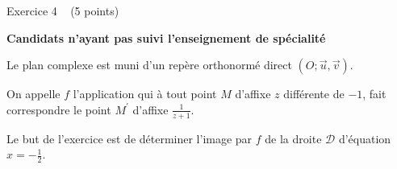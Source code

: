 
%
\begin{h2}Exercice 4   (5 points)\end{h2}
\textbf{Candidats n'ayant pas suivi l'enseignement de spécialité}
\par
Le plan complexe est muni d'un repère orthonormé direct $\left(O ; \vec{u},\vec{v}\right)$.
\par
On appelle $f $  l'application qui à tout point $M$ d'affixe $z$ différente de $-1$, fait correspondre le point $M^{\prime}$ d'affixe $\frac{1}{z+1}$.
\par
Le but de l'exercice est de déterminer l'image par $f$ de la droite $\mathscr D$ d'équation $x=-\frac{1}{2}$.
